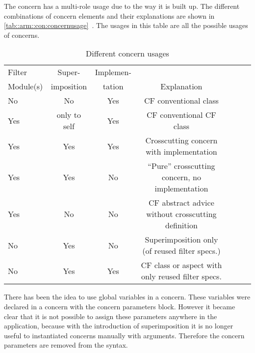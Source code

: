 The \Compose* concern has a multi-role usage due to the way it is built up.
The different combinations of concern elements and their explanations are shown in \autoref{tab::arm::con:concernusage}~\cite{bergmans:aosdbook05}.
The usages in this table are all the possible usages of concerns. 

\begin{table*}[tpb]
\begin{center}
	\centering
		\begin{tabular}{I c | c | c I l I} \hline
		Filter& Super- & Implemen- &  \\
		Module(s)& imposition & tation & Explanation\\ \hline
		No  & No	& Yes	& CF conventional class\\ \hline
	  Yes & only to self & Yes & CF conventional CF class\\ \hline
	  Yes & Yes & Yes	& Crosscutting concern with implementation\\ \hline
	  Yes & Yes & No	& ``Pure'' crosscutting concern, no implementation\\ \hline
	  Yes & No  & No 	& CF abstract advice without crosscutting definition\\ \hline
	  No  & Yes	& No 	& Superimposition only (of reused filter specs.)\\ \hline
	  No  & Yes	& Yes & CF class or aspect with only reused filter specs.\\ \hline
	 	\end{tabular}
	\caption{Different concern usages}
	\label{tab::arm::con:concernusage}
\end{center}
\end{table*}

There has been the idea to use global variables in a concern. These variables were declared in a concern with the concern parameters block. However it became clear that it is not possible to assign these parameters anywhere in the application, because with the introduction of superimposition it is no longer useful to instantiated concerns manually with arguments.
Therefore the concern parameters are removed from the \Compose* syntax.
